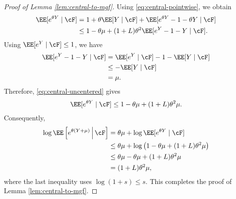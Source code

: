 \documentclass[11pt]{article}
\begin{document}
\begin{proof}[Proof of Lemma \ref{lem:central-to-mgf}]
Using \eqref{eq:central-pointwise}, we obtain
\begin{align}
    \EE[e^{\theta Y}\mid\cF]
    &=
    1+\theta\EE[Y\mid\cF]
    +
    \EE[
        e^{\theta Y}-1-\theta Y
        \mid\cF
    ]
    \notag\\
    &\leq
    1-\theta\mu
    +
    (1+L)\theta^2
    \EE[e^Y-1-Y\mid\cF].
    \label{eq:central-uncentered}
\end{align}
Using $\EE[e^Y\mid\cF]\leq1$, we have
\begin{align*}
    \EE[e^Y-1-Y\mid\cF]
    &=
    \EE[e^Y\mid\cF]-1-\EE[Y\mid\cF]\\
    &\leq
    -\EE[Y\mid\cF]\\
    &=
    \mu.
\end{align*}
Therefore, \eqref{eq:central-uncentered} gives
\begin{align*}
    \EE[e^{\theta Y}\mid\cF]
    \leq
    1-\theta\mu+(1+L)\theta^2\mu.
\end{align*}
Consequently,
\begin{align*}
    \log
    \EE\left[
        e^{\theta(Y+\mu)}
        \,\middle|\,
        \cF
    \right]
    &=
    \theta\mu+
    \log\EE[e^{\theta Y}\mid\cF]\\
    &\leq
    \theta\mu+
    \log\left(
        1-\theta\mu+(1+L)\theta^2\mu
    \right)\\
    &\leq
    \theta\mu-\theta\mu+(1+L)\theta^2\mu\\
    &=
    (1+L)\theta^2\mu,
\end{align*}
where the last inequality uses $\log(1+s)\leq s$. This completes the proof of Lemma \ref{lem:central-to-mgf}.
\end{proof}
\end{document}
